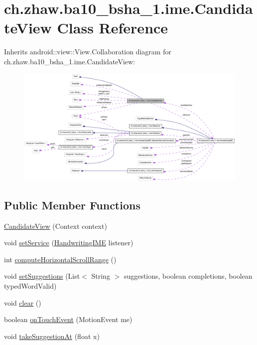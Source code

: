 \hypertarget{classch_1_1zhaw_1_1ba10__bsha__1_1_1ime_1_1CandidateView}{
\section{ch.zhaw.ba10\_\-bsha\_\-1.ime.CandidateView Class Reference}
\label{classch_1_1zhaw_1_1ba10__bsha__1_1_1ime_1_1CandidateView}
}


Inherits android::view::View.Collaboration diagram for ch.zhaw.ba10\_\-bsha\_\-1.ime.CandidateView:\nopagebreak
\begin{figure}[H]
\begin{center}
\leavevmode
\includegraphics[width=400pt]{classch_1_1zhaw_1_1ba10__bsha__1_1_1ime_1_1CandidateView__coll__graph}
\end{center}
\end{figure}
\subsection*{Public Member Functions}
\begin{DoxyCompactItemize}
\item 
\hyperlink{classch_1_1zhaw_1_1ba10__bsha__1_1_1ime_1_1CandidateView_a75f1d36bd5cff9a3ea522c83fc9b2f8e}{CandidateView} (Context context)
\item 
void \hyperlink{classch_1_1zhaw_1_1ba10__bsha__1_1_1ime_1_1CandidateView_ae5104c93fe283ac8ea6fa057ce007bc9}{setService} (\hyperlink{classch_1_1zhaw_1_1ba10__bsha__1_1_1ime_1_1HandwritingIME}{HandwritingIME} listener)
\item 
int \hyperlink{classch_1_1zhaw_1_1ba10__bsha__1_1_1ime_1_1CandidateView_a5e65e7d039376a5131044211f3affb37}{computeHorizontalScrollRange} ()
\item 
void \hyperlink{classch_1_1zhaw_1_1ba10__bsha__1_1_1ime_1_1CandidateView_a3b2b7c5d303e3e6c25dd7458d61b2a20}{setSuggestions} (List$<$ String $>$ suggestions, boolean completions, boolean typedWordValid)
\item 
void \hyperlink{classch_1_1zhaw_1_1ba10__bsha__1_1_1ime_1_1CandidateView_aa3d1a8c9206e423a3f532ef599b28cf4}{clear} ()
\item 
boolean \hyperlink{classch_1_1zhaw_1_1ba10__bsha__1_1_1ime_1_1CandidateView_a726242422f3279f05a81283406fa9d4a}{onTouchEvent} (MotionEvent me)
\item 
void \hyperlink{classch_1_1zhaw_1_1ba10__bsha__1_1_1ime_1_1CandidateView_af87d8229ab4a607f3a0e60dcfb435562}{takeSuggestionAt} (float x)
\end{DoxyCompactItemize}
